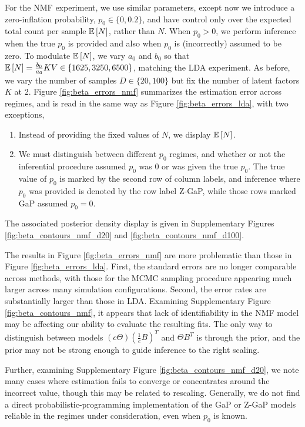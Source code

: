 \documentclass{article}
\begin{document}
For the NMF experiment, we use similar parameters, except now we introduce a
zero-inflation probability, $p_{0} \in \{0, 0.2\}$, and have control only over
the expected total count per sample $\mathbb{E}\left[{N}\right]$, rather than $N$. When $p_{0} >
0$, we perform inference when the true $p_0$ is provided and also when $p_{0}$
is (incorrectly) assumed to be zero. To modulate $\mathbb{E}\left[{N}\right]$, we vary $a_{0}$ and
$b_{0}$ so that $\mathbb{E}\left[{N}\right] = \frac{b_{0}}{a_{0}}KV \in \{1625, 3250, 6500\}$,
matching the LDA experiment. As before, we vary the number of samples $D \in
\{20, 100\}$ but fix the number of latent factors $K$ at 2. Figure
\ref{fig:beta_errors_nmf} summarizes the estimation error across regimes, and is
read in the same way as Figure \ref{fig:beta_errors_lda}, with two exceptions,
\begin{enumerate}
\item Instead of providing the fixed values of $N$, we display $\mathbb{E}\left[{N}\right]$.
\item We must distinguish between different $p_{0}$ regimes, and whether or not
  the inferential procedure assumed $p_{0}$ was 0 or was given the true $p_{0}$.
  The true value of $p_0$ is marked by the second row of column labels, and
  inference where $p_{0}$ was provided is denoted by the row label Z-GaP, while
  those rows marked GaP assumed $p_{0} = 0$.
\end{enumerate}
The associated posterior density display is given in Supplementary Figures
\ref{fig:beta_contours_nmf_d20} and \ref{fig:beta_contours_nmf_d100}.

The results in Figure \ref{fig:beta_errors_nmf} are more problematic than those
in Figure \ref{fig:beta_errors_lda}. First, the standard errors are no longer
comparable across methods, with those for the MCMC sampling procedure appearing
much larger across many simulation configurations. Second, the error rates are
substantially larger than those in LDA. Examining Supplementary Figure
\ref{fig:beta_contours_nmf}, it appears that lack of identifiability in the NMF
model may be affecting our ability to evaluate the resulting fits. The only way
to distinguish between models $\left(c\Theta\right)\left(\frac{1}{c}
B\right)^{T}$ and $\Theta B^{T}$ is through the prior, and the prior may not be
strong enough to guide inference to the right scaling.

Further, examining Supplementary Figure \ref{fig:beta_contours_nmf_d20}, we note
many cases where estimation fails to converge or concentrates around the
incorrect value, though this may be related to rescaling. Generally, we do not
find a direct probabilistic-programming implementation of the GaP or Z-GaP
models reliable in the regimes under consideration, even when $p_{0}$ is known.
\end{document}
